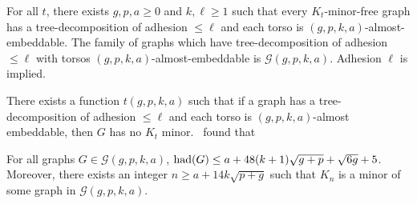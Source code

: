 \begin{theorem}\label{thm:gmst}
	For all \(t\), there exists \(g, p, a \geq 0\) and \(k, \ell \geq 1\) such that every \(K_t\)-minor-free graph has a tree-decomposition of adhesion \(\leq \ell\) and each torso is \((g, p, k, a)\)-almost-embeddable. The  family of graphs which have tree-decomposition of adhesion $\leq \ell$ with torsos $(g, p, k, a)$-almost-embeddable is \(\mathcal{G}(g, p, k, a)\). Adhesion $\ell$ is implied. 
\end{theorem}
There exists a function \(t(g, p, k, a)\) such that if a graph has a tree-decomposition of adhesion \(\leq \ell\) and each torso is \((g, p, k, a)\)-almost embeddable, then \(G\) has no \(K_t\) minor.\ \textcite{joretCompleteGraphMinors2013} found that
\begin{theorem}\label{thm:graph_structure_bound_theorem}
	For all graphs \(G \in \mathcal{G}(g, p, k, a)\),
	\(\operatorname{had}(G) \leq a + 48(k + 1)\sqrt{g + p} + \sqrt{6g} + 5\). Moreover, there exists an integer \(n \geq a + 1 4 k\sqrt{p + g}\) such that \(K_n\) is a minor of some graph in \(\mathcal{G}(g, p, k, a)\).
\end{theorem}

